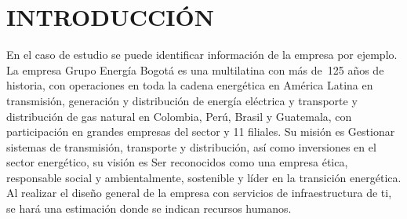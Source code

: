 \section{INTRODUCCIÓN}
\label{sec:Introduction}
En el caso de estudio se puede identificar información de la empresa por ejemplo. 
La empresa Grupo Energía Bogotá es una multilatina con más de 125 años de historia, 
con operaciones en toda la cadena energética en América Latina en transmisión, 
generación y distribución de energía eléctrica y transporte y distribución de gas natural en
 Colombia, Perú, Brasil y Guatemala, con participación en grandes empresas del sector y 11 filiales. 
 Su misión es Gestionar sistemas de transmisión, 
 transporte y distribución, así como inversiones en el sector energético, 
 su visión es Ser reconocidos como una empresa ética, responsable social y ambientalmente, 
 sostenible y líder en la transición energética. 
 Al realizar el diseño general de la empresa con servicios de infraestructura de ti, 
 se hará una estimación donde se indican recursos humanos. 
